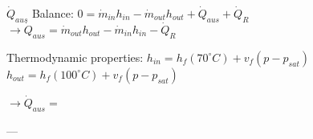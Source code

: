 \( \dot{Q}_{aus} \)  
Balance: \( 0 = \dot{m}_{in} h_{in} - \dot{m}_{out} h_{out} + \dot{Q}_{aus} + \dot{Q}_R \)  
\( \rightarrow \dot{Q}_{aus} = \dot{m}_{out} h_{out} - \dot{m}_{in} h_{in} - \dot{Q}_R \)  

Thermodynamic properties:  
\( h_{in} = h_f (70^\circ C) + v_f (p - p_{sat}) \)  
\( h_{out} = h_f (100^\circ C) + v_f (p - p_{sat}) \)  

\( \rightarrow \dot{Q}_{aus} = \)  

---